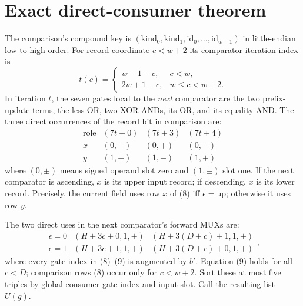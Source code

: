 \documentclass[11pt]{article}
\begin{document}
\section{Exact direct-consumer theorem}
The comparison's compound key is
$(\mathrm{kind}_0,\mathrm{kind}_1,
\mathrm{id}_0,\ldots,\mathrm{id}_{w-1})$ in little-endian
low-to-high order. For record coordinate $c<w+2$ its
comparator iteration index is
\[
 t(c)=\begin{cases}w-1-c,&c<w,\\2w+1-c,&w\le c<w+2.\end{cases}    \tag{7}
\]
In iteration $t$, the seven gates local to the \emph{next}
comparator are the two prefix-update terms, the less OR,
two XOR ANDs, its OR, and its equality AND.  The three
direct occurrences of the record bit in comparison are:
\[
 \begin{array}{c|ccc}
 \text{role}&(7t+0)&(7t+3)&(7t+4)\\ \hline
 x&(0,-)&(0,+)&(0,-)\\
 y&(1,+)&(1,-)&(1,+)
 \end{array}                                              \tag{8}
\]
where $(0,\pm)$ means signed operand slot zero and $(1,\pm)$
slot one. If the next comparator is ascending,
$x$ is its upper input record; if descending, $x$ is its lower
record. Precisely, the current field uses row $x$ of (8) iff
$\epsilon=\mathrm{up}$; otherwise it uses row $y$.

The two direct uses in the next comparator's forward MUXs are:
\[
\begin{array}{c|cc}
\epsilon=0 &(H+3c+0,1,+)&(H+3(D+c)+1,1,+)\\
\epsilon=1 &(H+3c+1,1,+)&(H+3(D+c)+0,1,+)
\end{array},                                               \tag{9}
\]
where every gate index in (8)--(9) is augmented by $b'$.
Equation (9) holds for all $c<D$; comparison rows (8) occur only
for $c<w+2$.  Sort these at most five triples by global consumer
gate index and input slot.  Call the resulting list $U(g)$.
\end{document}
